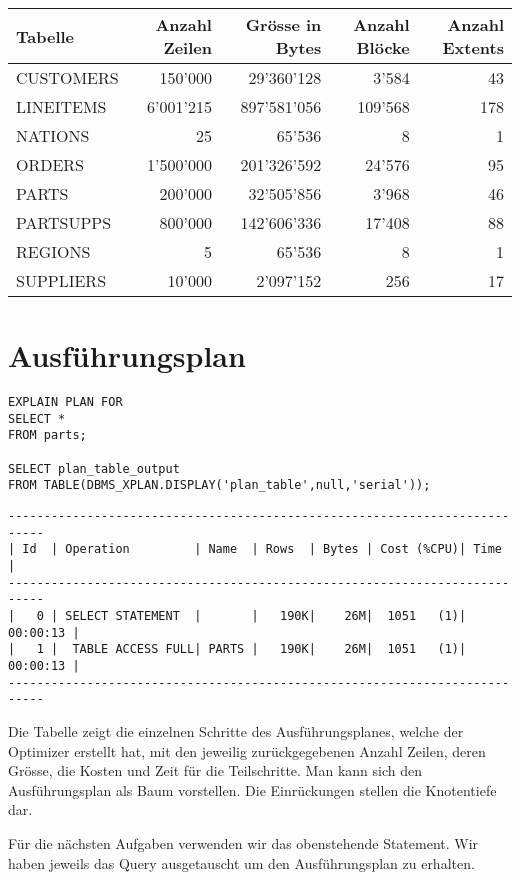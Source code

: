 \documentclass[10pt]{article}
\begin{document}
\begin{tabular}{l||r|r|r|r}
  Tabelle & Anzahl Zeilen & Grösse in Bytes & Anzahl Blöcke & Anzahl Extents \\ \hline
  \hline
  CUSTOMERS & 150'000 & 29'360'128 & 3'584 & 43 \\ \hline
  LINEITEMS & 6'001'215 & 897'581'056 & 109'568 & 178 \\ \hline
  NATIONS & 25 & 65'536 & 8 & 1 \\ \hline
  ORDERS & 1'500'000 & 201'326'592 & 24'576 & 95 \\ \hline
  PARTS & 200'000 & 32'505'856 & 3'968 & 46 \\ \hline
  PARTSUPPS & 800'000 & 142'606'336 & 17'408 & 88 \\ \hline
  REGIONS & 5 & 65'536 & 8 & 1 \\ \hline
  SUPPLIERS & 10'000 & 2'097'152 & 256 & 17 \\
\end{tabular}	

\section{Ausführungsplan}
\begin{lstlisting}[style=sql]
EXPLAIN PLAN FOR
SELECT *
FROM parts;

SELECT plan_table_output
FROM TABLE(DBMS_XPLAN.DISPLAY('plan_table',null,'serial'));
\end{lstlisting}
\begin{lstlisting}[style=queryexecutionplan]
---------------------------------------------------------------------------
| Id  | Operation         | Name  | Rows  | Bytes | Cost (%CPU)| Time     |
---------------------------------------------------------------------------
|   0 | SELECT STATEMENT  |       |   190K|    26M|  1051   (1)| 00:00:13 |
|   1 |  TABLE ACCESS FULL| PARTS |   190K|    26M|  1051   (1)| 00:00:13 |
---------------------------------------------------------------------------
\end{lstlisting}
Die Tabelle zeigt die einzelnen Schritte des Ausführungsplanes, welche der 
Optimizer erstellt hat, mit den jeweilig zurückgegebenen Anzahl Zeilen, deren 
Grösse, die Kosten und Zeit für die Teilschritte. Man kann sich den 
Ausführungsplan als Baum vorstellen. Die Einrückungen stellen die Knotentiefe dar.

Für die nächsten Aufgaben verwenden wir das obenstehende Statement. Wir 
haben jeweils das Query ausgetauscht um den Ausführungsplan zu erhalten.
\end{document}
